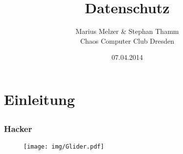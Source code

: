 \documentclass[12pt]{beamer}
\title{Datenschutz}
\author{\small Marius Melzer \& Stephan Thamm\\\large Chaos Computer Club Dresden}
\date{07.04.2014}
\begin{document}
\maketitle

\section{Einleitung}
\subsection{}

\begin{frame}
  \frametitle{Hacker}
  \begin{figure}
    \texttt{[image: img/Glider.pdf]}
  \end{figure}
\end{frame}
\end{document}
